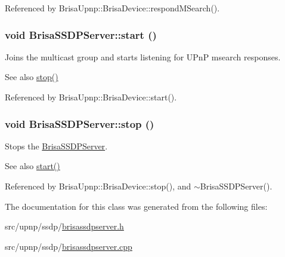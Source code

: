 Referenced by BrisaUpnp::BrisaDevice::respondMSearch().\hypertarget{classBrisaUpnp_1_1BrisaSSDPServer_a76ec5ae1f66a8ee27241c7b0a629d9a4}{
\subsubsection[{start}]{\setlength{\rightskip}{0pt plus 5cm}void BrisaSSDPServer::start ()}}
\label{classBrisaUpnp_1_1BrisaSSDPServer_a76ec5ae1f66a8ee27241c7b0a629d9a4}


Joins the multicast group and starts listening for UPnP msearch responses. \begin{DoxySeeAlso}{See also}
\hyperlink{classBrisaUpnp_1_1BrisaSSDPServer_a681a0e4e49df9c97862cda09d27642a7}{stop()} 
\end{DoxySeeAlso}


Referenced by BrisaUpnp::BrisaDevice::start().\hypertarget{classBrisaUpnp_1_1BrisaSSDPServer_a681a0e4e49df9c97862cda09d27642a7}{
\subsubsection[{stop}]{\setlength{\rightskip}{0pt plus 5cm}void BrisaSSDPServer::stop ()}}
\label{classBrisaUpnp_1_1BrisaSSDPServer_a681a0e4e49df9c97862cda09d27642a7}


Stops the \hyperlink{classBrisaUpnp_1_1BrisaSSDPServer}{BrisaSSDPServer}. \begin{DoxySeeAlso}{See also}
\hyperlink{classBrisaUpnp_1_1BrisaSSDPServer_a76ec5ae1f66a8ee27241c7b0a629d9a4}{start()} 
\end{DoxySeeAlso}


Referenced by BrisaUpnp::BrisaDevice::stop(), and $\sim$BrisaSSDPServer().

The documentation for this class was generated from the following files:\begin{DoxyCompactItemize}
\item 
src/upnp/ssdp/\hyperlink{brisassdpserver_8h}{brisassdpserver.h}\item 
src/upnp/ssdp/\hyperlink{brisassdpserver_8cpp}{brisassdpserver.cpp}\end{DoxyCompactItemize}
